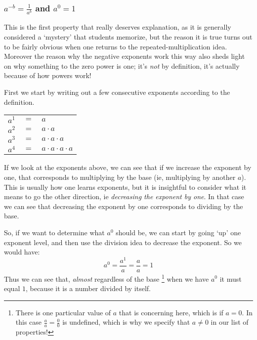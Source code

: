 \documentclass{ximera}
\begin{document}
    \subsubsection*{$a^{-b} = \frac{1}{a^b}$ and $a^0 = 1$}
        This is the first property that really deserves explanation, as it is generally considered a `mystery' that students memorize, but the reason it is true turns out to be fairly obvious when one returns to the repeated-multiplication idea. Moreover the reason why the negative exponents work this way also sheds light on why something to the zero power is one; it's \textit{not} by definition, it's actually because of how powers work!
        
        
        First we start by writing out a few consecutive exponents according to the definition.
        
        \begin{center}
            \begin{tabular}{ccl}
                $a^1$ & $ = $ & $a$ \\
                $a^2$ & $ = $ & $a \cdot a$ \\
                $a^3$ & $ = $ & $a \cdot a \cdot a$ \\
                $a^4$ & $ = $ & $a \cdot a \cdot a \cdot a$ \\
            \end{tabular}
        \end{center}
        
        If we look at the exponents above, we can see that if we increase the exponent by one, that corresponds to multiplying by the base (ie, multiplying by another $a$). This is usually how one learns exponents, but it is insightful to consider what it means to go the other direction, ie \textit{decreasing the exponent by one}. In that case we can see that decreasing the exponent by one corresponds to dividing by the base.
        
        So, if we want to determine what $a^0$ should be, we can start by going `up' one exponent level, and then use the division idea to decrease the exponent. So we would have:
        \[
            a^0 = \frac{a^1}{a} = \frac{a}{a} = 1
        \]
        Thus we can see that, \textit{almost} regardless of the base%
        \footnote{%
            There is one particular value of $a$ that is concerning here, which is if $a = 0$. In this case $\frac{a}{a} = \frac{0}{0}$ is undefined, which is why we specify that $a \neq 0$ in our list of properties!
            }
        when we have $a^0$ it must equal $1$, because it is a number divided by itself.
        
\end{document}
